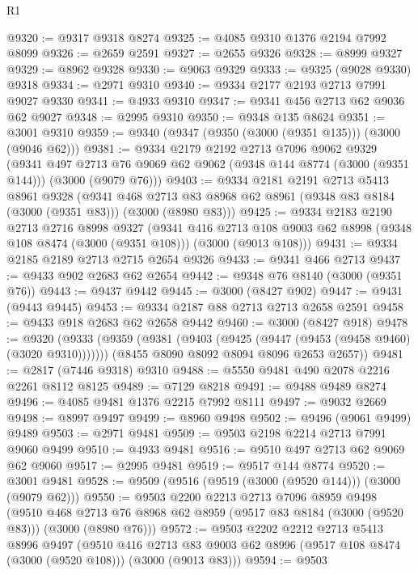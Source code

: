 \begin{lexlean}{R1}
\begin{coremodule}
@9320 := @9317 @9318 @8274
@9325 := @4085 @9310 @1376 @2194 @7992 @8099
@9326 := @2659 @2591
@9327 := @2655 @9326
@9328 := @8999 @9327
@9329 := @8962 @9328
@9330 := @9063 @9329
@9333 := @9325 (@9028 @9330) @9318
@9334 := @2971 @9310
@9340 := @9334 @2177 @2193 @2713 @7991 @9027 @9330
@9341 := @4933 @9310
@9347 := @9341 @456 @2713 @62 @9036 @62 @9027
@9348 := @2995 @9310
@9350 := @9348 @135 @8624
@9351 := @3001 @9310
@9359 := @9340 (@9347 (@9350 (@3000 (@9351 @135))) (@3000 (@9046 @62)))
@9381 := @9334
    @2179
    @2192
    @2713
    @7096
    @9062
    @9329
    (@9341
      @497
      @2713
      @76
      @9069
      @62
      @9062
      (@9348 @144 @8774 (@3000 (@9351 @144)))
      (@3000 (@9079 @76)))
@9403 := @9334
    @2181
    @2191
    @2713
    @5413
    @8961
    @9328
    (@9341 @468 @2713 @83 @8968 @62 @8961 (@9348 @83 @8184 (@3000 (@9351 @83))) (@3000 (@8980 @83)))
@9425 := @9334
    @2183
    @2190
    @2713
    @2716
    @8998
    @9327
    (@9341
      @416
      @2713
      @108
      @9003
      @62
      @8998
      (@9348 @108 @8474 (@3000 (@9351 @108)))
      (@3000 (@9013 @108)))
@9431 := @9334 @2185 @2189 @2713 @2715 @2654 @9326
@9433 := @9341 @466 @2713
@9437 := @9433 @902 @2683 @62 @2654
@9442 := @9348 @76 @8140 (@3000 (@9351 @76))
@9443 := @9437 @9442
@9445 := @3000 (@8427 @902)
@9447 := @9431 (@9443 @9445)
@9453 := @9334 @2187 @88 @2713 @2713 @2658 @2591
@9458 := @9433 @918 @2683 @62 @2658 @9442
@9460 := @3000 (@8427 @918)
@9478 := @9320
    (@9333
      (@9359 (@9381 (@9403 (@9425 (@9447 (@9453 (@9458 @9460) (@3020 @9310)))))))
      (@8455 @8090 @8092 @8094 @8096 @2653 @2657))
@9481 := @2817 (@7446 @9318) @9310
@9488 := @5550 @9481 @490 @2078 @2216 @2261 @8112 @8125
@9489 := @7129 @8218
@9491 := @9488 @9489 @8274
@9496 := @4085 @9481 @1376 @2215 @7992 @8111
@9497 := @9032 @2669
@9498 := @8997 @9497
@9499 := @8960 @9498
@9502 := @9496 (@9061 @9499) @9489
@9503 := @2971 @9481
@9509 := @9503 @2198 @2214 @2713 @7991 @9060 @9499
@9510 := @4933 @9481
@9516 := @9510 @497 @2713 @62 @9069 @62 @9060
@9517 := @2995 @9481
@9519 := @9517 @144 @8774
@9520 := @3001 @9481
@9528 := @9509 (@9516 (@9519 (@3000 (@9520 @144))) (@3000 (@9079 @62)))
@9550 := @9503
    @2200
    @2213
    @2713
    @7096
    @8959
    @9498
    (@9510 @468 @2713 @76 @8968 @62 @8959 (@9517 @83 @8184 (@3000 (@9520 @83))) (@3000 (@8980 @76)))
@9572 := @9503
    @2202
    @2212
    @2713
    @5413
    @8996
    @9497
    (@9510
      @416
      @2713
      @83
      @9003
      @62
      @8996
      (@9517 @108 @8474 (@3000 (@9520 @108)))
      (@3000 (@9013 @83)))
@9594 := @9503

\end{coremodule}
\end{lexlean}
